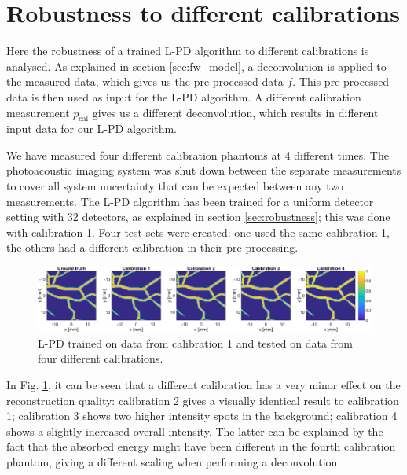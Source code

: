 \documentclass[journal]{IEEEtran}
\begin{document}
{\section{Robustness to different calibrations}\label{app:cal}
Here the robustness of a trained L-PD algorithm to different calibrations is analysed. As explained in section \ref{sec:fw_model}, a deconvolution is applied to the measured data, which gives us the pre-processed data $f$. This pre-processed data is then used as input for the L-PD algorithm. A different calibration measurement $p_\text{cal}$ gives us a different deconvolution, which results in different input data for our L-PD algorithm. 

We have measured four different calibration phantoms at 4 different times. The photoacoustic imaging system was shut down between the separate measurements to cover all system uncertainty that can be expected between any two measurements. The L-PD algorithm has been trained for a uniform detector setting with 32 detectors, as explained in section \ref{sec:robustness}; this was done with calibration 1. Four test sets were created: one used the same calibration 1, the others had a different calibration in their pre-processing. 

\begin{figure}[ht!]
\centering
\includegraphics[width=\linewidth]{images//calibration_changes.png}
\caption{L-PD trained on data from calibration 1 and tested on data from four different calibrations.}
\label{fig:Cal_results}
\end{figure}

In Fig. \ref{fig:Cal_results}, it can be seen that a different calibration has a very minor effect on the reconstruction quality: calibration 2 gives a visually identical result to calibration 1; calibration 3 shows two higher intensity spots in the background; calibration 4 shows a slightly increased overall intensity. The latter can be explained by the fact that the absorbed energy might have been different in the fourth calibration phantom, giving a different scaling when performing a deconvolution.
}
\end{document}

